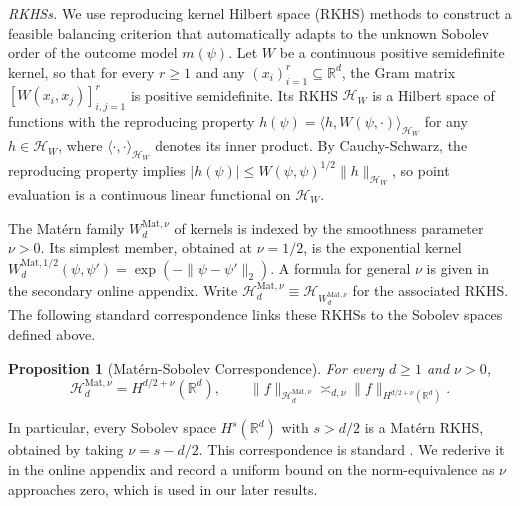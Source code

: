 \documentclass[letterpaper,12pt]{article}
\newtheorem{prop}[thm]{Proposition}
\theoremstyle{definition}
\numberwithin{equation}{section}
\newcommand{\mr}{\mathbb{R}}
\newcommand{\mc}{\mathcal}
\newcommand{\norm}[1]{\lVert#1\rVert}
\begin{document}
\emph{RKHSs.} We use reproducing kernel Hilbert space (RKHS) methods to construct a feasible balancing criterion that automatically adapts to the unknown Sobolev order of the outcome model $m(\psi)$.
Let $W$ be a continuous positive semidefinite kernel, so that for every $r\geq1$ and any $(x_i)_{i=1}^r \subseteq \mathbb{R}^d$, the Gram matrix $[W(x_i,x_j)]_{i,j=1}^r$ is positive semidefinite.
Its RKHS $\mc H_W$ is a Hilbert space of functions with the reproducing property $h(\psi)=\langle h,W(\psi,\cdot)\rangle_{\mc H_W}$ for any $h\in\mc H_W$, where $\langle\cdot,\cdot\rangle_{\mc H_W}$ denotes its inner product.
By Cauchy-Schwarz, the reproducing property implies $|h(\psi)|\leq W(\psi,\psi)^{1/2}\norm{h}_{\mc H_W}$, so point evaluation is a continuous linear functional on $\mc H_W$.

The Mat\'ern family $W_d^{\mathrm{Mat},\nu}$ of kernels is indexed by the smoothness parameter $\nu>0$.
Its simplest member, obtained at $\nu=1/2$, is the exponential kernel $W_d^{\mathrm{Mat},1/2}(\psi,\psi')=\exp(-\norm{\psi-\psi'}_2)$.
A formula for general $\nu$ is given in the secondary online appendix.
Write $\mc H_d^{\mathrm{Mat},\nu}\equiv\mc H_{W_d^{\mathrm{Mat},\nu}}$ for the associated RKHS.
The following standard correspondence links these RKHSs to the Sobolev spaces defined above.

\begin{prop}[Mat\'ern-Sobolev Correspondence]\label{proposition:matern-sobolev-equivalence}
For every $d\geq1$ and $\nu>0$,
\begin{equation}\label{equation:matern-sobolev-equivalence}
\mc H_d^{\mathrm{Mat},\nu} = H^{d/2+\nu}(\mr^d), \qquad \norm{f}_{\mc H_d^{\mathrm{Mat},\nu}} \asymp_{d,\nu} \norm{f}_{H^{d/2+\nu}(\mr^d)}.
\end{equation}
\end{prop}
In particular, every Sobolev space $H^s(\mr^d)$ with $s>d/2$ is a Mat\'ern RKHS, obtained by taking $\nu=s-d/2$.
This correspondence is standard \citep{wendland2005scattered,kanagawa2018gaussian}.
We rederive it in the online appendix and record a uniform bound on the norm-equivalence as $\nu$ approaches zero, which is used in our later results.

\end{document}
